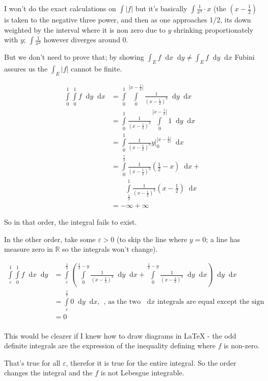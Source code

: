 \documentclass[11pt,oneside]{article}
\numberwithin{equation}{section}
\theoremstyle{definition}
\def\RR{\mathbb{R}}
\newcommand*\diff{\mathop{}\!\mathrm{d}}
\newcommand{\abs}[1]{\left| {#1} \right|}
\begin{document}
\begin{solution}
\begin{enumerate}[(a)]
  I won't do the exact calculations on $\int \left| f \right|$ but it's
  basically $\int \frac{1}{x^3} \cdot x $ (the $(x - \frac{1}{2})$ is
  taken to the negative three power, and then as one approaches 1/2,
  its down weighted by the interval where it is non zero due to $y$
  shrinking proportionately with $y$; $\int \frac{1}{x^2}$ however diverges
  around $0$.

  But we don't need to prove that; by showing $\int _ E f \diff x \diff y \neq \int _ E f \diff y \diff x$
  Fubini assures us the $\int _E \left| f \right| $ cannot be finite.  


  \begin{align*}
  \int \limits _0^1  \int \limits _0 ^ 1 f \diff y \diff x & =   \int \limits _0^1  \int \limits _0 ^ {\abs{x - \frac{1}{2}}} \frac{1}{(x - \frac{1}{2})^3} \diff y \diff x \\
  & =   \int \limits _0^1  \frac{1}{(x - \frac{1}{2})^3} \int \limits _0 ^ {\abs{x - \frac{1}{2}}} 1 \diff y \diff x \\
  & =   \int \limits _0^1  \frac{1}{(x - \frac{1}{2})^3} y \rvert _ 0 ^ {\abs{x - \frac{1}{2}}} \diff x \\
  & =   \int \limits _0^{\frac{1}{2}} \frac{1}{(x - \frac{1}{2})^3} (\frac{1}{2} - x) \diff x  + \\
    & \quad \quad  \int \limits _{\frac{1}{2}}^{1} \frac{1}{(x -\frac{1}{2})^3} (x - \frac{1}{2} ) \diff x  \\
    & = - \infty + \infty 
  \end{align*}

  So in that order, the integral fails to exist.  

  In the other order, take some $\varepsilon > 0$ (to skip the line where $y = 0$; a line has measure zero in $\RR$ so the integrals won't change).  

  \begin{align*}
    \int \limits _\varepsilon ^1  \int \limits _0 ^ 1 f \diff x \diff y & = \int \limits _\varepsilon^{\frac{1}{2}}  \left( \int \limits _0 ^ {\frac{1}{2}-y} \frac{1}{(x - \frac{1}{2})^3} \diff y \diff x  + \int \limits _0 ^ {\frac{1}{2}-y} \frac{1}{(x - \frac{1}{2})^3} \diff y \diff x \right) \diff y \diff x \\ 
    & = \int \limits _\varepsilon^{\frac{1}{2}} 0  \diff y \diff x,  \ \ \textrm{, as the two } \diff x \textrm{ integrals are equal except the sign} \\
    & = 0 \\
  \end{align*}

  This would be clearer if I knew how to draw diagrams in LaTeX - the
  odd definite integrals are the expression of the inequality defining
  where $f$ is non-zero.
  
  That's true for all $\varepsilon$, therefor it is true for the
  entire integral.  So the order changes the integral and the $f$ is
  not Lebesgue integrable.
  
\end{enumerate}
\end{solution}
\end{document}
